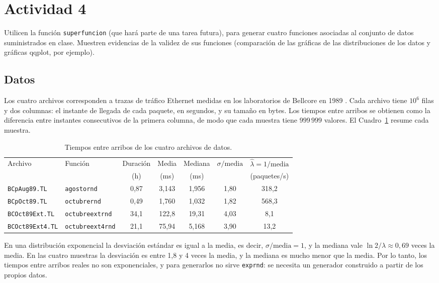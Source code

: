 \documentclass[12pt]{article}
\begin{document}
\section{Actividad 4}

Utilicen la función \texttt{superfuncion} (que hará parte de una tarea futura), para generar cuatro funciones asociadas al conjunto de datos suministrados en clase. Muestren evidencias de la validez de sus funciones (comparación de las gráficas de las distribuciones de los datos y gráficas qqplot, por ejemplo).

\subsection{Datos}

Los cuatro archivos corresponden a trazas de tráfico Ethernet medidas en los laboratorios de Bellcore en 1989 \autocite{leland1994}. Cada archivo tiene $10^6$ filas y dos columnas: el instante de llegada de cada paquete, en segundos, y su tamaño en bytes. Los tiempos entre arribos se obtienen como la diferencia entre instantes consecutivos de la primera columna, de modo que cada muestra tiene $999\,999$ valores. El Cuadro~\ref{tab:datos} resume cada muestra.

\begin{table}[!htbp]
\centering
{\small\setlength{\tabcolsep}{4pt}
\begin{tabular}{l l c c c c c}
\hline
Archivo & Función & Duración & Media & Mediana & $\sigma/\text{media}$ & $\hat{\lambda}=1/\text{media}$ \\
 & & (h) & (ms) & (ms) & & (paquetes/s) \\
\hline
\texttt{BCpAug89.TL}    & \texttt{agostornd}      & 0,87 & 3,143 & 1,956 & 1,80 & 318,2 \\
\texttt{BCpOct89.TL}    & \texttt{octubrernd}     & 0,49 & 1,760 & 1,032 & 1,82 & 568,3 \\
\texttt{BCOct89Ext.TL}  & \texttt{octubreextrnd}  & 34,1 & 122,8 & 19,31 & 4,03 & 8,1 \\
\texttt{BCOct89Ext4.TL} & \texttt{octubreext4rnd} & 21,1 & 75,94 & 5,168 & 3,90 & 13,2 \\
\hline
\end{tabular}}
\caption{Tiempos entre arribos de los cuatro archivos de datos.}
\label{tab:datos}
\end{table}

En una distribución exponencial la desviación estándar es igual a la media, es decir, $\sigma/\text{media}=1$, y la mediana vale $\ln 2/\lambda\approx 0{,}69$ veces la media. En las cuatro muestras la desviación es entre 1,8 y 4 veces la media, y la mediana es mucho menor que la media. Por lo tanto, los tiempos entre arribos reales no son exponenciales, y para generarlos no sirve \texttt{exprnd}: se necesita un generador construido a partir de los propios datos.
\end{document}
